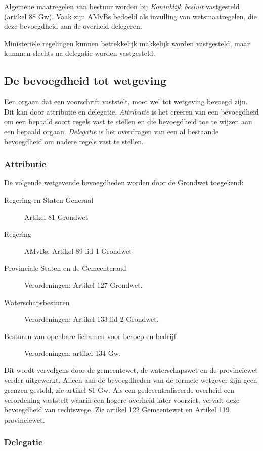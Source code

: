 \documentclass{article}
\begin{document}
Algemene maatregelen van bestuur worden bij \emph{Koninklijk besluit}
vastgesteld (artikel 88 Gw). Vaak zijn AMvBs bedoeld als invulling van
wetsmaatregelen, die deze bevoegdheid aan de overheid delegeren.

Ministeriële regelingen kunnen betrekkelijk makkelijk worden vastgesteld, maar
kunnnen slechts na delegatie worden vastgesteld. 


\subsection{De bevoegdheid tot wetgeving}

Een orgaan dat een voorschrift vaststelt, moet wel tot wetgeving bevoegd
zijn. Dit kan door attributie en delegatie. \emph{Attributie} is het 
creëren van een bevoegdheid om een bepaald soort regels vast te stellen
en die bevoegdheid toe te wijzen aan een bepaald orgaan. \emph{Delegatie}
is het overdragen van een al bestaande bevoegdheid om nadere regels vast 
te stellen. 

\subsubsection{Attributie}

De volgende wetgevende bevoegdheden worden door de Grondwet toegekend:

\begin{description}
  \item[Regering en Staten-Generaal] Artikel 81 Grondwet
  \item[Regering] AMvBs: Artikel 89 lid 1 Grondwet
  \item[Provinciale Staten en de Gemeenteraad] Verordeningen: Artikel 127 Grondwet.
  \item[Waterschapsbesturen] Verordeningen: Artikel 133 lid 2 Grondwet.
  \item[Besturen van openbare lichamen voor beroep en bedrijf]Verordeningen:
    artikel 134 Gw.
\end{description}

Dit wordt vervolgens door de gemeentewet, de waterschapswet en de provinciewet
verder uitgewerkt. Alleen aan de bevoegdheden van de formele wetgever zijn geen
grenzen gesteld, zie artikel 81 Gw. Als een gedecentraliseerde overheid een
verordening vaststelt waarin een hogere overheid later voorziet, vervalt deze
bevoegdheid van rechtswege. Zie artikel 122 Gemeentewet en Artikel 119
provinciewet. 

\subsubsection{Delegatie}
\end{document}
